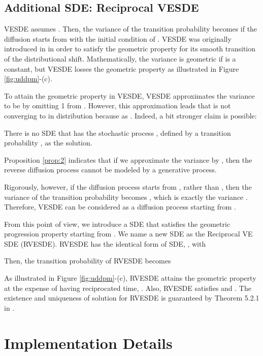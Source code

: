 \documentclass[nohyperref]{article}
\theoremstyle{plain}
\theoremstyle{definition}
\theoremstyle{remark}
\begin{document}
\subsection{Additional SDE: Reciprocal VESDE}

VESDE assumes . Then, the variance of the transition probability  becomes  if the diffusion starts from  with the initial condition of . VESDE was originally introduced in \citet{song2020improved} in order to satisfy the geometric property for its smooth transition of the distributional shift. Mathematically, the variance is geometric if  is a constant, but VESDE losses the geometric property as illustrated in Figure \ref{fig:uddpm}-(c).

To attain the geometric property in VESDE, VESDE approximates the variance to be  by omitting 1 from . However, this approximation leads that  is not converging to  in distribution because  as . Indeed, a bit stronger claim is possible:
\begin{proposition}\label{prop:2}
		There is no SDE that has the stochastic process , defined by a transition probability , as the solution.
	\end{proposition}
	Proposition \ref{prop:2} indicates that if we approximate the variance by , then the reverse diffusion process cannot be modeled by a generative process. 

Rigorously, however, if the diffusion process starts from , rather than , then the variance of the transition probability becomes , which is exactly the variance . Therefore, VESDE can be considered as a diffusion process starting from .

From this point of view, we introduce a SDE that satisfies the geometric progression property starting from . We name a new SDE as the Reciprocal VE SDE (RVESDE). RVESDE has the identical form of SDE, , with

Then, the transition probability of RVESDE becomes

As illustrated in Figure \ref{fig:uddpm}-(c), RVESDE attains the geometric property at the expense of having reciprocated time, . Also, RVESDE satisfies  and . The existence and uniqueness of solution for RVESDE is guaranteed by Theorem 5.2.1 in \cite{oksendal2013stochastic}. 

\section{Implementation Details}\label{sec:implementation_details}
\end{document}
